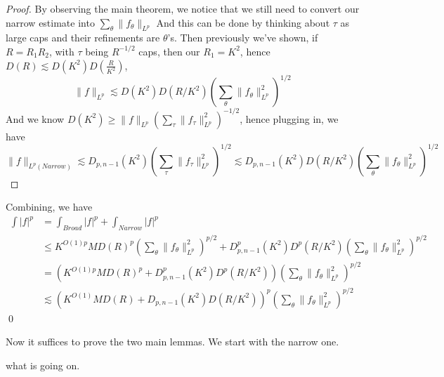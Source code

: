 \begin{proof}
    By observing the main theorem, we notice that we still need to convert our narrow estimate into $\sum_\theta\|f_\theta\|_{L^p}$
    And this can be done by thinking about $\tau$ as large caps and their refinements are $\theta$'s. Then previously we've shown, if $R=R_1R_2$, with $\tau$ being $R^{-1/2}$ caps, then our $R_1=K^2$, hence $D(R)\lesssim D(K^2)D(\frac{R}{K^2})$,
    \begin{equation*}
        \|f\|_{L^p}\lesssim D(K^2)D(R/K^2)\left(\sum_\theta\|f_\theta\|_{L^p}^2 \right)^{1/2}
    \end{equation*}
    And we know $D(K^2)\geq\|f\|_{L^p}\left(\sum_\tau\|f_\tau\|_{L^p}^2 \right)^{-1/2}$, hence plugging in, we have
    \begin{equation*}
        \|f\|_{L^p(Narrow)}\lesssim D_{p,n-1}(K^2)\left(\sum_\tau\|f_\tau\|_{L^p}^2 \right)^{1/2}\lesssim D_{p,n-1}(K^2)D(R/K^2)\left(\sum_\theta\|f_\theta\|_{L^p}^2 \right)^{1/2}
    \end{equation*}
\end{proof}
    Combining, we have
    \begin{align*}
        \int|f|^p&=\int_{Broad}|f|^p+\int_{Narrow}|f|^p\\
        &\leq K^{O(1)p}MD(R)^p\left(\sum_\theta\|f_\theta\|_{L^p}^2 \right)^{p/2}+D_{p,n-1}^p(K^2)D^p(R/K^2)\left(\sum_\theta\|f_\theta\|_{L^p}^2 \right)^{p/2}\\
        &=\left(K^{O(1)p}MD(R)^p+D_{p,n-1}^p(K^2)D^p(R/K^2)\right)\left(\sum_\theta\|f_\theta\|_{L^p}^2 \right)^{p/2}\\
        &\lesssim \left(K^{O(1)}MD(R)+D_{p,n-1}(K^2)D(R/K^2)\right)^p\left(\sum_\theta\|f_\theta\|_{L^p}^2 \right)^{p/2}
    \end{align*}
\qed

Now it suffices to prove the two main lemmas. We start with the narrow one.

what is going on.